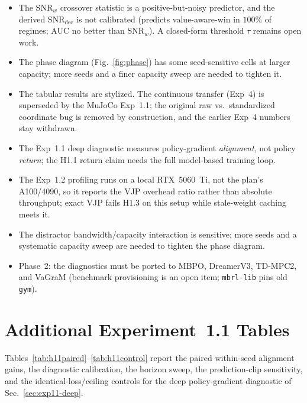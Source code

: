 \documentclass{article}
\theoremstyle{plain}
\begin{document}
\begin{itemize}
\item The $\mathrm{SNR}_w$ crossover statistic is a positive-but-noisy predictor, and
  the derived $\mathrm{SNR}_{\mathrm{dec}}$ is not calibrated (predicts value-aware-win
  in $100\%$ of regimes; AUC no better than $\mathrm{SNR}_w$). A closed-form threshold
  $\tau$ remains open work.
\item The phase diagram (Fig.~\ref{fig:phase}) has some seed-sensitive cells at larger
  capacity; more seeds and a finer capacity sweep are needed to tighten it.
\item The tabular results are stylized. The continuous transfer (Exp~4) is superseded by
  the MuJoCo Exp~1.1; the original raw vs.\ standardized coordinate bug is removed by
  construction, and the earlier Exp~4 numbers stay withdrawn.
\item The Exp~1.1 deep diagnostic measures policy-gradient \emph{alignment}, not policy
  \emph{return}; the H1.1 return claim needs the full model-based training loop.
\item The Exp~1.2 profiling runs on a local RTX~5060~Ti, not the plan's A100/4090, so it
  reports the VJP overhead ratio rather than absolute throughput; exact VJP fails H1.3 on
  this setup while stale-weight caching meets it.
\item The distractor bandwidth/capacity interaction is sensitive; more seeds and a
  systematic capacity sweep are needed to tighten the phase diagram.
\item Phase~2: the diagnostics must be ported to MBPO, DreamerV3, TD-MPC2, and VaGraM
  (benchmark provisioning is an open item; \texttt{mbrl-lib} pins old \texttt{gym}).
\end{itemize}




\newpage
\appendix
\onecolumn

\section{Additional Experiment~1.1 Tables}
\label{app:h11}

Tables~\ref{tab:h11paired}--\ref{tab:h11control} report the paired within-seed
alignment gains, the diagnostic calibration, the horizon sweep, the prediction-clip
sensitivity, and the identical-loss/ceiling controls for the deep policy-gradient
diagnostic of Sec.~\ref{sec:exp11-deep}.
\end{document}
